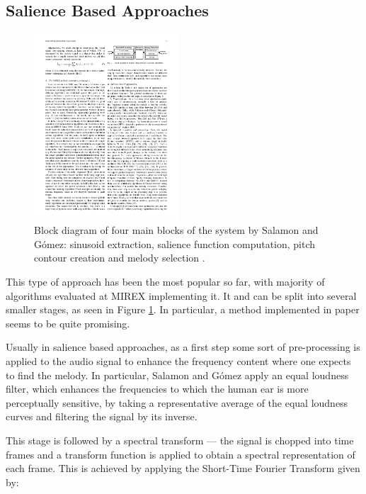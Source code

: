 \subsection{Salience Based Approaches}

\begin{figure}
  \vspace{-60pt}

  \begin{center}
    \includegraphics[width=0.48\textwidth]{Figures/salienceoveralldiagram}
  \end{center}
  \caption{Block diagram of four main blocks of the system by Salamon and G\'{o}mez: sinusoid extraction, salience function computation, pitch contour creation and melody selection \cite{comparison}.}
  \label{fig:3stepsalience}
\end{figure}

This type of approach has been the most popular so far, with majority of algorithms evaluated at MIREX implementing it. It and can be split into several smaller stages, as seen in Figure \ref{fig:3stepsalience}. In particular, a method implemented in paper \cite{salamon} seems to be quite promising.

Usually in salience based approaches, as a first step some sort of pre-processing is applied to the audio signal to enhance the frequency content where one expects to find the melody. In particular, Salamon and G\'{o}mez apply an equal loudness filter, which enhances the frequencies to which the human ear is more perceptually sensitive, by taking a representative average of the equal loudness curves and filtering the signal by its inverse. 

This stage is followed by a spectral transform — the signal is chopped into time frames and a transform function is applied to obtain a spectral representation of each frame.
This is achieved by applying the Short-Time Fourier Transform given by:

